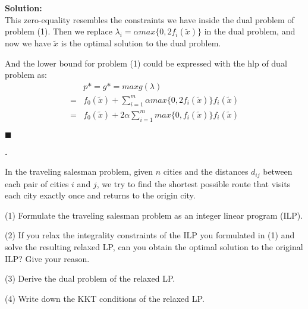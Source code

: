 \documentclass{article}
\newcounter{pcounter}                                   %
\newenvironment{problem}                                %
{                                                       %
    \stepcounter{pcounter}                              %
    \textbf{\arabic{pcounter}.}                         %
}{}                                                     %
\newenvironment{solution}                               %
{\textbf{Solution:} \\}{$\blacksquare$\newline}         %
\begin{document}
\begin{solution}
    This zero-equality resembles the constraints we have inside the dual problem of problem (1). Then we replace $\lambda_i = \alpha max\{0, 2f_i(\tilde{x})\}$ in the dual problem, and now we have $\tilde{x}$ is the optimal solution to the dual problem.

    And the lower bound for problem (1) could be expressed with the hlp of dual problem as:
    \begin{align*}
        &p* = g* = max g(\lambda) \\
        = & f_0(\tilde{x}) + \sum_{i=1}^m \alpha max\{0, 2f_i(\tilde{x})\} f_i(\tilde{x}) \\
        = & f_0(\tilde{x}) + 2\alpha \sum_{i=1}^m max\{0, f_i(\tilde{x})\} f_i(\tilde{x})
    \end{align*}

\end{solution}

\begin{problem}
    In the traveling salesman problem, given $n$ cities and the distances $d_{ij}$ between each pair of cities $i$ and $j$, we try to find the shortest possible route that visits each city exactly once and returns to the origin city.

    (1) Formulate the traveling salesman problem as an integer linear program (ILP).

    (2) If you relax the integrality constraints of the ILP you formulated in (1) and solve the resulting relaxed LP, can you obtain the optimal solution to the original ILP? Give your reason.

    (3) Derive the dual problem of the relaxed LP.

    (4) Write down the KKT conditions of the relaxed LP.
\end{problem}
\end{document}
